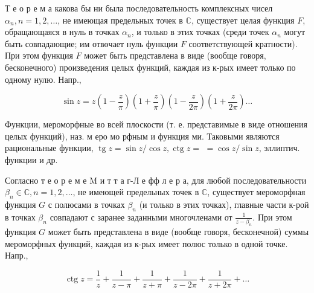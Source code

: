 \documentclass[10pt]{article}
\begin{document}
Т е о р е м а какова бы ни была последовательность комплексных чисел $\alpha_{n}, n=1,2, \ldots$, не имеющая предельных точек в $\mathbb{C}$, существует целая функция $F$, обращающаяся в нуль в точках $\alpha_{n}$, и только в этих точках (среди точек $\alpha_{n}$ могут быть совпадающие; им отвөчает нуль функции $F$ соответствующей кратности). При этом функция $F$ может быть представлена в виде (вообще говоря, бесконечного) произведения целых функций, каждая из к-рых имеет только по одному нулю. Напр.,



\[

\sin z=z\left(1-\frac{z}{\pi}\right)\left(1+\frac{z}{\pi}\right)\left(1-\frac{z}{2 \pi}\right)\left(1+\frac{z}{2 \pi}\right) \ldots

\]



Функции, мероморфные во всей плоскости (т. е. представимые в виде отношения целых функций), наз. м еро мо рфным и функция ми. Таковыми являются рациональные функции, $\operatorname{tg} z=\sin z / \cos z, \operatorname{ctg} z=$ $=\cos z / \sin z$, эллиптич. функции и др.



Согласно т е о р е м е M и т т а г-Л е фф л е р а, для любой последовательности $\beta_{n} \in \mathbb{C}, n=1,2, \ldots$, не имеющей предельных точек в $\mathbb{C}$, существует мероморфная функция $G$ с полюсами в точках $\beta_{n}$ (и только в этих точках), главные части к-рой в точках $\beta_{n}$ совпадают с заранее заданными многочленами от $\frac{1}{z-\beta_{n}}$. При этом функция $G$ может быть представлена в виде (вообще говоря, бесконечной) суммы мероморфных функций, каждая из к-рых имеет полюс только в одной точке. Напр.,



\[

\operatorname{ctg} z=\frac{1}{z}+\frac{1}{z-\pi}+\frac{1}{z+\pi}+\frac{1}{z-2 \pi}+\frac{1}{z+2 \pi}+\ldots

\]
\end{document}
